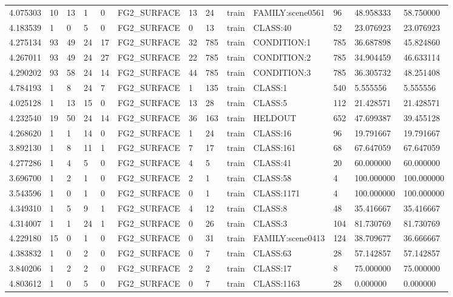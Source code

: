 \begin{tabular}{lllllllllllll}
4.075303 & 10 & 13 & 1 & 0 & FG2\_SURFACE & 13 & 24 & train & FAMILY:scene0561 & 96 & 48.958333 & 58.750000 \\
4.183539 & 1 & 0 & 5 & 0 & FG2\_SURFACE & 0 & 13 & train & CLASS:40 & 52 & 23.076923 & 23.076923 \\
4.275134 & 93 & 49 & 24 & 17 & FG2\_SURFACE & 32 & 785 & train & CONDITION:1 & 785 & 36.687898 & 45.824860 \\
4.267011 & 93 & 49 & 24 & 27 & FG2\_SURFACE & 22 & 785 & train & CONDITION:2 & 785 & 34.904459 & 46.633114 \\
4.290202 & 93 & 58 & 24 & 14 & FG2\_SURFACE & 44 & 785 & train & CONDITION:3 & 785 & 36.305732 & 48.251408 \\
4.784193 & 1 & 8 & 24 & 7 & FG2\_SURFACE & 1 & 135 & train & CLASS:1 & 540 & 5.555556 & 5.555556 \\
4.025128 & 1 & 13 & 15 & 0 & FG2\_SURFACE & 13 & 28 & train & CLASS:5 & 112 & 21.428571 & 21.428571 \\
4.232540 & 19 & 50 & 24 & 14 & FG2\_SURFACE & 36 & 163 & train & HELDOUT & 652 & 47.699387 & 39.455128 \\
4.268620 & 1 & 1 & 14 & 0 & FG2\_SURFACE & 1 & 24 & train & CLASS:16 & 96 & 19.791667 & 19.791667 \\
3.892130 & 1 & 8 & 11 & 1 & FG2\_SURFACE & 7 & 17 & train & CLASS:161 & 68 & 67.647059 & 67.647059 \\
4.277286 & 1 & 4 & 5 & 0 & FG2\_SURFACE & 4 & 5 & train & CLASS:41 & 20 & 60.000000 & 60.000000 \\
3.696700 & 1 & 2 & 1 & 0 & FG2\_SURFACE & 2 & 1 & train & CLASS:58 & 4 & 100.000000 & 100.000000 \\
3.543596 & 1 & 0 & 1 & 0 & FG2\_SURFACE & 0 & 1 & train & CLASS:1171 & 4 & 100.000000 & 100.000000 \\
4.349310 & 1 & 5 & 9 & 1 & FG2\_SURFACE & 4 & 12 & train & CLASS:8 & 48 & 35.416667 & 35.416667 \\
4.314007 & 1 & 1 & 24 & 1 & FG2\_SURFACE & 0 & 26 & train & CLASS:3 & 104 & 81.730769 & 81.730769 \\
4.229180 & 15 & 0 & 1 & 0 & FG2\_SURFACE & 0 & 31 & train & FAMILY:scene0413 & 124 & 38.709677 & 36.666667 \\
4.383832 & 1 & 0 & 2 & 0 & FG2\_SURFACE & 0 & 7 & train & CLASS:63 & 28 & 57.142857 & 57.142857 \\
3.840206 & 1 & 2 & 2 & 0 & FG2\_SURFACE & 2 & 2 & train & CLASS:17 & 8 & 75.000000 & 75.000000 \\
4.803612 & 1 & 0 & 5 & 0 & FG2\_SURFACE & 0 & 7 & train & CLASS:1163 & 28 & 0.000000 & 0.000000 \\

\end{tabular}

